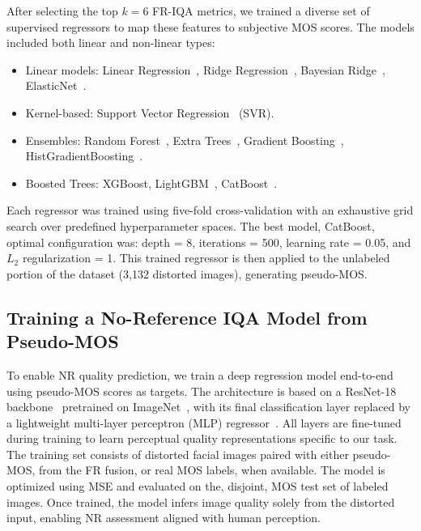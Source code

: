 After selecting the top $k = 6$ FR-IQA metrics, we trained a diverse set of supervised regressors to map these features to subjective MOS scores. The models included both linear and non-linear types:

\begin{itemize}
    \item Linear models: Linear Regression~\cite{linearregression}, Ridge Regression~\cite{ridgeregression}, Bayesian Ridge~\cite{bayesianridge}, ElasticNet~\cite{elasticnet}.
    \item Kernel-based: Support Vector Regression~\cite{svr} (SVR).
    \item Ensembles: Random Forest~\cite{randomforest}, Extra Trees~\cite{ensembles}, Gradient Boosting~\cite{gradboosting}, HistGradientBoosting~\cite{histboost}.
    \item Boosted Trees: XGBoost\cite{xgboost}, LightGBM~\cite{lightgbm}, CatBoost~\cite{catboost}.
\end{itemize}

Each regressor was trained using five-fold cross-validation with an exhaustive grid search over predefined hyperparameter spaces. The best model, CatBoost, optimal configuration was: depth = 8, iterations = 500, learning rate = 0.05, and $L_2$ regularization = 1. This trained regressor is then applied to the unlabeled portion of the dataset (3,132 distorted images), generating pseudo-MOS.\@

\subsection{Training a No-Reference IQA Model from Pseudo-MOS}

To enable NR quality prediction, we train a deep regression model end-to-end using pseudo-MOS scores as targets. The architecture is based on a ResNet-18 backbone~\cite{resnet} pretrained on ImageNet~\cite{imagenet}, with its final classification layer replaced by a lightweight multi-layer perceptron (MLP) regressor~\cite{bayesianridge}. All layers are fine-tuned during training to learn perceptual quality representations specific to our task. The training set consists of distorted facial images paired with either pseudo-MOS, from the FR fusion, or real MOS labels, when available. The model is optimized using MSE and evaluated on the, disjoint, MOS test set of labeled images. Once trained, the model infers image quality solely from the distorted input, enabling NR assessment aligned with human perception.

